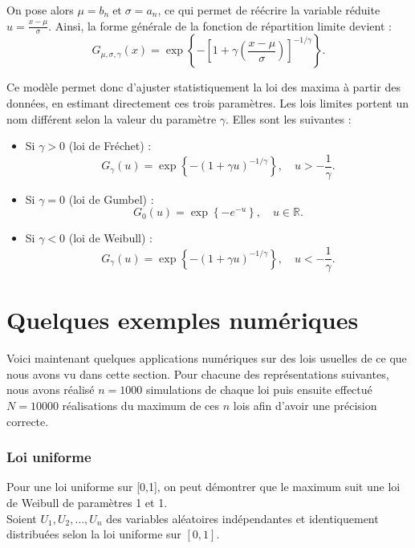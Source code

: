 \documentclass{article}
\theoremstyle{plain}
\theoremstyle{definition}
\theoremstyle{plain}
\begin{document}
On pose alors $\mu = b_n \; \text{et} \; \sigma = a_n$, ce qui permet de réécrire la variable réduite \(u = \frac{x - \mu}{\sigma}\). Ainsi, la forme générale de la fonction de répartition limite devient :
\[
G_{\mu, \sigma, \gamma}(x) = \exp\left\{-\left[1 + \gamma \left(\frac{x - \mu}{\sigma} \right)\right]^{-1/\gamma} \right\}.
\]

Ce modèle permet donc d’ajuster statistiquement la loi des maxima à partir des données, en estimant directement ces trois paramètres. Les lois limites portent un nom différent selon la valeur du paramètre \(\gamma\).
Elles sont les suivantes :
\\
\begin{itemize}
    \item Si \(\gamma>0\) (loi de Fréchet) :
    \[
    G_\gamma(u)=\exp\left\{-\left(1+\gamma u\right)^{-1/\gamma}\right\}, \quad u > -\frac{1}{\gamma}.
    \]
    
    \item Si \(\gamma=0\) (loi de Gumbel) :
    \[
    G_0(u)=\exp\left\{-e^{-u}\right\}, \quad u\in\mathbb{R}.
    \]
    
    \item Si \(\gamma<0\) (loi de Weibull) :
    \[
    G_\gamma(u)=\exp\left\{-\left(1+\gamma u\right)^{-1/\gamma}\right\}, \quad u < -\frac{1}{\gamma}.
    \]
\end{itemize}

\vspace{1cm}
\section{Quelques exemples numériques}

\noindent Voici maintenant quelques applications numériques sur des lois usuelles de ce que nous avons vu dans cette section. Pour chacune des représentations suivantes, nous avons réalisé $n=1000$ simulations de chaque loi puis ensuite effectué $N=10000$ réalisations du maximum de ces $n$ lois afin d'avoir une précision correcte. 

\subsubsection{Loi uniforme}

Pour une loi uniforme sur [0,1], on peut démontrer que le maximum suit une loi de Weibull de paramètres 1 et 1. \\
\noindent Soient \( U_1, U_2, \dots, U_n \) des variables aléatoires indépendantes et identiquement distribuées selon la loi uniforme sur \([0,1]\).
\end{document}
